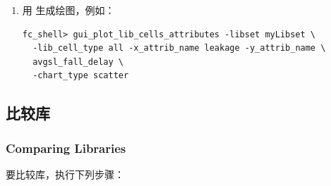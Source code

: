 \begin{enumerate}
  \item 用  生成绘图，例如：
\begin{lstlisting}
fc_shell> gui_plot_lib_cells_attributes -libset myLibset \
  -lib_cell_type all -x_attrib_name leakage -y_attrib_name \
  avgsl_fall_delay \
  -chart_type scatter
\end{lstlisting}
\end{enumerate}

\subsection{比较库}
\subsubsection*{Comparing Libraries}

要比较库，执行下列步骤：

